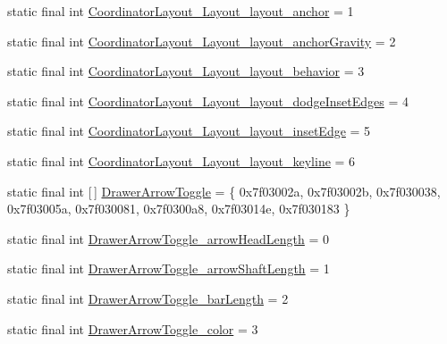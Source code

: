 \begin{DoxyCompactItemize}
\item 
static final int \mbox{\hyperlink{classandroid_1_1support_1_1v7_1_1appcompat_1_1_r_1_1styleable_a96363d52ba6b97cde2170bbb6f128caa}{Coordinator\+Layout\+\_\+\+Layout\+\_\+layout\+\_\+anchor}} = 1
\item 
static final int \mbox{\hyperlink{classandroid_1_1support_1_1v7_1_1appcompat_1_1_r_1_1styleable_a307940c17efbdb6a7211feede423a2c9}{Coordinator\+Layout\+\_\+\+Layout\+\_\+layout\+\_\+anchor\+Gravity}} = 2
\item 
static final int \mbox{\hyperlink{classandroid_1_1support_1_1v7_1_1appcompat_1_1_r_1_1styleable_a6f412b6d1e0539d7e0af1146cb9d8879}{Coordinator\+Layout\+\_\+\+Layout\+\_\+layout\+\_\+behavior}} = 3
\item 
static final int \mbox{\hyperlink{classandroid_1_1support_1_1v7_1_1appcompat_1_1_r_1_1styleable_a64119fcac3b80cd91fa97abba74ebedc}{Coordinator\+Layout\+\_\+\+Layout\+\_\+layout\+\_\+dodge\+Inset\+Edges}} = 4
\item 
static final int \mbox{\hyperlink{classandroid_1_1support_1_1v7_1_1appcompat_1_1_r_1_1styleable_aff8007c64c64948e62220a2e5b74194f}{Coordinator\+Layout\+\_\+\+Layout\+\_\+layout\+\_\+inset\+Edge}} = 5
\item 
static final int \mbox{\hyperlink{classandroid_1_1support_1_1v7_1_1appcompat_1_1_r_1_1styleable_a0cbc8647fb7e8c66e5fa53e87f793915}{Coordinator\+Layout\+\_\+\+Layout\+\_\+layout\+\_\+keyline}} = 6
\item 
static final int \mbox{[}$\,$\mbox{]} \mbox{\hyperlink{classandroid_1_1support_1_1v7_1_1appcompat_1_1_r_1_1styleable_a7bd3ecc07eb763b454c40c0871959a35}{Drawer\+Arrow\+Toggle}} = \{ 0x7f03002a, 0x7f03002b, 0x7f030038, 0x7f03005a, 0x7f030081, 0x7f0300a8, 0x7f03014e, 0x7f030183 \}
\item 
static final int \mbox{\hyperlink{classandroid_1_1support_1_1v7_1_1appcompat_1_1_r_1_1styleable_a72cc7e3ed61db5e3d7706bf08e50835a}{Drawer\+Arrow\+Toggle\+\_\+arrow\+Head\+Length}} = 0
\item 
static final int \mbox{\hyperlink{classandroid_1_1support_1_1v7_1_1appcompat_1_1_r_1_1styleable_af4c2d441d3064d37a2503f20ae40dd2a}{Drawer\+Arrow\+Toggle\+\_\+arrow\+Shaft\+Length}} = 1
\item 
static final int \mbox{\hyperlink{classandroid_1_1support_1_1v7_1_1appcompat_1_1_r_1_1styleable_a9803c7705602c81b9a1da96464e0f66a}{Drawer\+Arrow\+Toggle\+\_\+bar\+Length}} = 2
\item 
static final int \mbox{\hyperlink{classandroid_1_1support_1_1v7_1_1appcompat_1_1_r_1_1styleable_a778acebe5d0d81bc358d6395592f2f4e}{Drawer\+Arrow\+Toggle\+\_\+color}} = 3

\end{DoxyCompactItemize}
